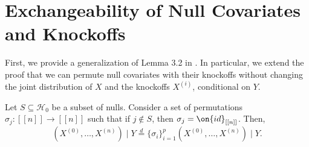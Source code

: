 \documentclass[11pt,reqno]{report}
\theoremstyle{definition}
\numberwithin{equation}{section}
\begin{document}
\section{Exchangeability of Null Covariates and Knockoffs}
First, we provide a generalization of Lemma 3.2 in \cite{panning}. In particular, we extend the proof that we can permute null covariates with their knockoffs without changing the joint distribution of $X$ and the knockoffs $X^{(i)}$, conditional on $Y$.
\begin{lem}
\label{lemma2.3}
Let $S \subseteq \mathcal{H}_0$ be a subset of nulls. Consider a set of permutations $\sigma_j : [[ n ]] \to [[ n ]]$ such that if $j \not \in S$, then $\sigma_j = \on{id}_{[[ n ]]}$. Then,
\[(X^{(0)}, \ldots, X^{(n)}) \mid Y \overset{d}= \{ \sigma_i \}_{i=1}^p \left( X^{(0)}, \ldots, X^{(n)} \right) \mid Y. \]
\end{lem}
\end{document}
